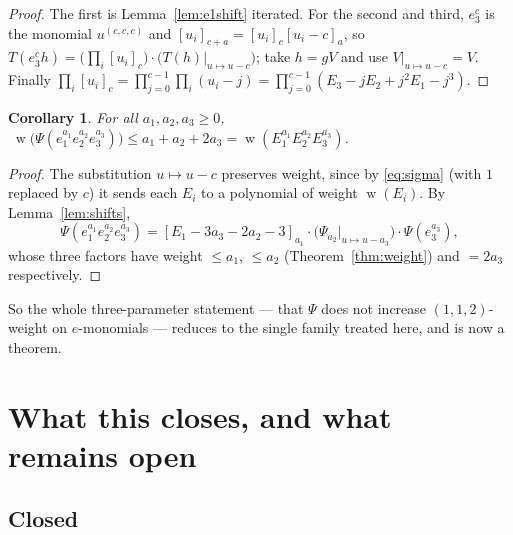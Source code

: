 \documentclass[10pt]{article}
\theoremstyle{plain}
\newtheorem{corollary}[theorem]{Corollary}
\theoremstyle{definition}
\newcommand{\ffal}[2]{[#1]_{#2}}
\newcommand{\wt}{\operatorname{w}}
\begin{document}
\begin{proof}
The first is Lemma~\ref{lem:e1shift} iterated. For the second and third, $e_3^c$ is the
monomial $u^{(c,c,c)}$ and $\ffal{u_i}{c+a}=\ffal{u_i}{c}\ffal{u_i-c}{a}$, so
$T(e_3^ch)=\big(\prod_i\ffal{u_i}{c}\big)\cdot\big(T(h)\big|_{u\mapsto u-c}\big)$; take
$h=gV$ and use $V|_{u\mapsto u-c}=V$. Finally
$\prod_i\ffal{u_i}{c}=\prod_{j=0}^{c-1}\prod_i(u_i-j)=\prod_{j=0}^{c-1}
(E_3-jE_2+j^2E_1-j^3)$.
\end{proof}

\begin{corollary}\label{cor:monomial}
For all $a_1,a_2,a_3\ge0$,
$\;\wt\big(\Psi(e_1^{a_1}e_2^{a_2}e_3^{a_3})\big)\le a_1+a_2+2a_3
=\wt(E_1^{a_1}E_2^{a_2}E_3^{a_3})$.
\end{corollary}

\begin{proof}
The substitution $u\mapsto u-c$ preserves weight, since by \eqref{eq:sigma} (with $1$
replaced by $c$) it sends each $E_i$ to a polynomial of weight $\wt(E_i)$. By
Lemma~\ref{lem:shifts},
\[
 \Psi(e_1^{a_1}e_2^{a_2}e_3^{a_3})
 =\ffal{E_1-3a_3-2a_2-3}{a_1}\cdot\big(\Psi_{a_2}\big|_{u\mapsto u-a_3}\big)
   \cdot\Psi(e_3^{a_3}),
\]
whose three factors have weight $\le a_1$, $\le a_2$ (Theorem~\ref{thm:weight}) and
$=2a_3$ respectively.
\end{proof}

So the whole three-parameter statement --- that $\Psi$ does not increase $(1,1,2)$-weight on
$e$-monomials --- reduces to the single family treated here, and is now a theorem.

\section{What this closes, and what remains open}\label{sec:closes}

\subsection{Closed}
\end{document}
